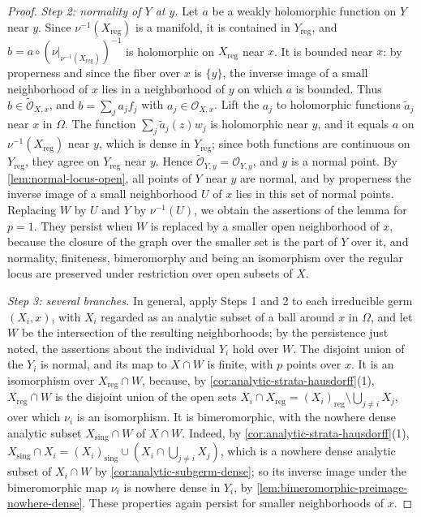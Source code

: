 \begin{proof}
\emph{Step 2: normality of $Y$ at $y$.} Let $a$ be a weakly holomorphic function on $Y$ near $y$. Since $\nu^{-1}(X_{\mathrm{reg}})$ is a manifold, it is contained in $Y_{\mathrm{reg}}$, and $b=a\circ(\nu|_{\nu^{-1}(X_{\mathrm{reg}})})^{-1}$ is holomorphic on $X_{\mathrm{reg}}$ near $x$. It is bounded near $x$: by properness and since the fiber over $x$ is $\{y\}$, the inverse image of a small neighborhood of $x$ lies in a neighborhood of $y$ on which $a$ is bounded. Thus $b\in\widetilde{\mathcal O}_{X,x}$, and $b=\sum_ja_jf_j$ with $a_j\in\mathcal O_{X,x}$. Lift the $a_j$ to holomorphic functions $\widetilde a_j$ near $x$ in $\Omega$. The function $\sum_j\widetilde a_j(z)w_j$ is holomorphic near $y$, and it equals $a$ on $\nu^{-1}(X_{\mathrm{reg}})$ near $y$, which is dense in $Y_{\mathrm{reg}}$; since both functions are continuous on $Y_{\mathrm{reg}}$, they agree on $Y_{\mathrm{reg}}$ near $y$. Hence $\widetilde{\mathcal O}_{Y,y}=\mathcal O_{Y,y}$, and $y$ is a normal point. By \cref{lem:normal-locus-open}, all points of $Y$ near $y$ are normal, and by properness the inverse image of a small neighborhood $U$ of $x$ lies in this set of normal points. Replacing $W$ by $U$ and $Y$ by $\nu^{-1}(U)$, we obtain the assertions of the lemma for $p=1$. They persist when $W$ is replaced by a smaller open neighborhood of $x$, because the closure of the graph over the smaller set is the part of $Y$ over it, and normality, finiteness, bimeromorphy and being an isomorphism over the regular locus are preserved under restriction over open subsets of $X$.

\emph{Step 3: several branches.} In general, apply Steps 1 and 2 to each irreducible germ $(X_i,x)$, with $X_i$ regarded as an analytic subset of a ball around $x$ in $\Omega$, and let $W$ be the intersection of the resulting neighborhoods; by the persistence just noted, the assertions about the individual $Y_i$ hold over $W$. The disjoint union of the $Y_i$ is normal, and its map to $X\cap W$ is finite, with $p$ points over $x$. It is an isomorphism over $X_{\mathrm{reg}}\cap W$, because, by \cref{cor:analytic-strata-hausdorff}(1), $X_{\mathrm{reg}}\cap W$ is the disjoint union of the open sets $X_i\cap X_{\mathrm{reg}}=(X_i)_{\mathrm{reg}}\setminus\bigcup_{j\neq i}X_j$, over which $\nu_i$ is an isomorphism. It is bimeromorphic, with the nowhere dense analytic subset $X_{\mathrm{sing}}\cap W$ of $X\cap W$. Indeed, by \cref{cor:analytic-strata-hausdorff}(1), $X_{\mathrm{sing}}\cap X_i=(X_i)_{\mathrm{sing}}\cup(X_i\cap\bigcup_{j\neq i}X_j)$, which is a nowhere dense analytic subset of $X_i\cap W$ by \cref{cor:analytic-subgerm-dense}; so its inverse image under the bimeromorphic map $\nu_i$ is nowhere dense in $Y_i$, by \cref{lem:bimeromorphic-preimage-nowhere-dense}. These properties again persist for smaller neighborhoods of $x$.
\end{proof}

